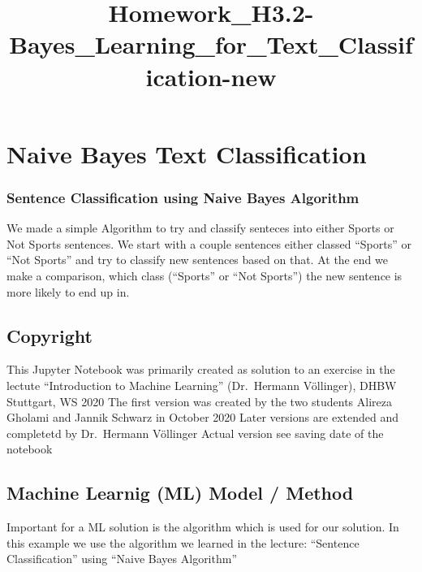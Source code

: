 \documentclass[11pt]{article}
\title{Homework\_H3.2-Bayes\_Learning\_for\_Text\_Classification-new}
\begin{document}
    
    \maketitle
    
    

    
    \hypertarget{naive-bayes-text-classification}{%
\section{Naive Bayes Text
Classification}\label{naive-bayes-text-classification}}

\hypertarget{sentence-classification-using-naive-bayes-algorithm}{%
\subsubsection{Sentence Classification using Naive Bayes
Algorithm}\label{sentence-classification-using-naive-bayes-algorithm}}

We made a simple Algorithm to try and classify senteces into either
Sports or Not Sports sentences. We start with a couple sentences either
classed ``Sports'' or ``Not Sports'' and try to classify new sentences
based on that. At the end we make a comparison, which class (``Sports''
or ``Not Sports'') the new sentence is more likely to end up in.

\hypertarget{copyright}{%
\subsection{Copyright}\label{copyright}}

This Jupyter Notebook was primarily created as solution to an exercise
in the lectute ``Introduction to Machine Learning'' (Dr.~Hermann
Völlinger), DHBW Stuttgart, WS 2020 The first version was created by the
two students Alireza Gholami and Jannik Schwarz in October 2020 Later
versions are extended and completetd by Dr.~Hermann Völlinger Actual
version see saving date of the notebook

\hypertarget{machine-learnig-ml-model-method}{%
\subsection{Machine Learnig (ML) Model /
Method}\label{machine-learnig-ml-model-method}}

Important for a ML solution is the algorithm which is used for our
solution. In this example we use the algorithm we learned in the
lecture: ``Sentence Classification'' using ``Naive Bayes Algorithm''
\end{document}
